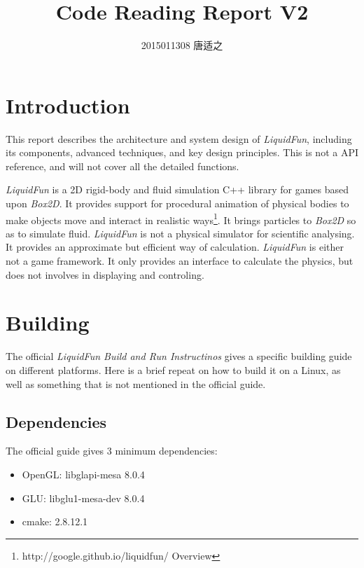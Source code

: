 \documentclass[UTF8]{ctexart}
\title{\huge Code Reading Report V2}
\author{\large 2015011308 唐适之}
\date{}
\begin{document}
    
    \maketitle

    \tableofcontents

    \section{Introduction}

        This report describes the architecture and system design of \textit{LiquidFun}, including its components, advanced techniques, and key design principles. This is not a API reference, and will not cover all the detailed functions.

        \textit{LiquidFun} is a 2D rigid-body and fluid simulation C++ library for games based upon \textit{Box2D}. It provides support for procedural animation of physical bodies to make objects move and interact in realistic ways\footnote{http://google.github.io/liquidfun/ Overview}. It brings particles to \textit{Box2D} so as to simulate fluid. \textit{LiquidFun} is not a physical simulator for scientific analysing. It provides an approximate but efficient way of calculation. \textit{LiquidFun} is either not a game framework. It only provides an interface to calculate the physics, but does not involves in displaying and controling.

    \section{Building}
        
        The official \textit{LiquidFun Build and Run Instructinos} gives a specific building guide on different platforms. Here is a brief repeat on how to build it on a Linux, as well as something that is not mentioned in the official guide.

        \subsection{Dependencies}

            The official guide gives 3 minimum dependencies:
            
            \begin{itemize}
                \item OpenGL: libglapi-mesa 8.0.4
                \item GLU: libglu1-mesa-dev 8.0.4
                \item cmake: 2.8.12.1
            \end{itemize}
\end{document}

